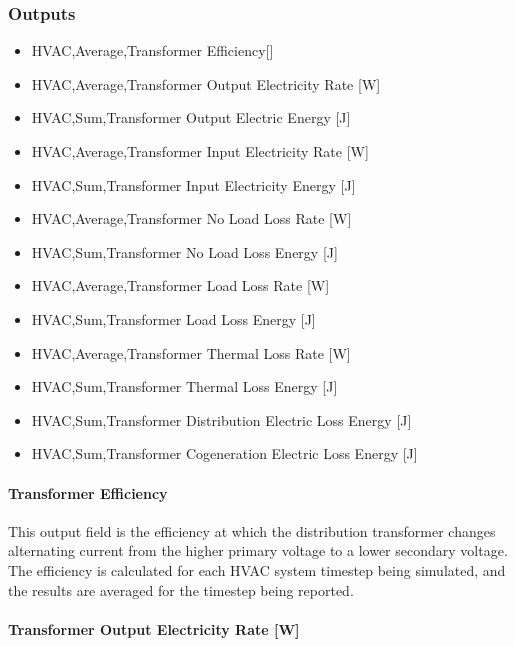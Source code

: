 \subsubsection{Outputs}\label{outputs-010}

\begin{itemize}
\item
  HVAC,Average,Transformer Efficiency{[]}
\item
  HVAC,Average,Transformer Output Electricity Rate {[}W{]}
\item
  HVAC,Sum,Transformer Output Electric Energy {[}J{]}
\item
  HVAC,Average,Transformer Input Electricity Rate {[}W{]}
\item
  HVAC,Sum,Transformer Input Electricity Energy {[}J{]}
\item
  HVAC,Average,Transformer No Load Loss Rate {[}W{]}
\item
  HVAC,Sum,Transformer No Load Loss Energy {[}J{]}
\item
  HVAC,Average,Transformer Load Loss Rate {[}W{]}
\item
  HVAC,Sum,Transformer Load Loss Energy {[}J{]}
\item
  HVAC,Average,Transformer Thermal Loss Rate {[}W{]}
\item
  HVAC,Sum,Transformer Thermal Loss Energy {[}J{]}
\item
  HVAC,Sum,Transformer Distribution Electric Loss Energy {[}J{]}
\item
  HVAC,Sum,Transformer Cogeneration Electric Loss Energy {[}J{]}
\end{itemize}

\paragraph{Transformer Efficiency}\label{transformer-efficiency}

This output field is the efficiency at which the distribution transformer changes alternating current from the higher primary voltage to a lower secondary voltage. The efficiency is calculated for each HVAC system timestep being simulated, and the results are averaged for the timestep being reported.

\paragraph{Transformer Output Electricity Rate {[}W{]}}\label{transformer-output-electric-power-w}

